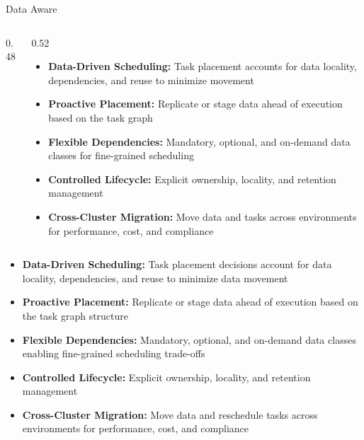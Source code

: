 \begin{frame}{Data Aware}
\begin{columns}[T]
\begin{column}{0.48\textwidth}
		\end{column}
		\begin{column}{0.52\textwidth}
			\vspace{0.4cm}
			\begin{itemize}
				\item \textbf{Data-Driven Scheduling:} Task placement accounts for data locality, dependencies, and reuse to minimize movement
				\item \textbf{Proactive Placement:} Replicate or stage data ahead of execution based on the task graph
				\item \textbf{Flexible Dependencies:} Mandatory, optional, and on-demand data classes for fine-grained scheduling
				\item \textbf{Controlled Lifecycle:} Explicit ownership, locality, and retention management
				\item \textbf{Cross-Cluster Migration:} Move data and tasks across environments for performance, cost, and compliance
			\end{itemize}
		\end{column}
	\end{columns}

	\note
	{
		\begin{itemize}
			\item \textbf{Data-Driven Scheduling:} Task placement decisions account for data locality, dependencies, and reuse to minimize data movement
			\item \textbf{Proactive Placement:} Replicate or stage data ahead of execution based on the task graph structure
			\item \textbf{Flexible Dependencies:} Mandatory, optional, and on-demand data classes enabling fine-grained scheduling trade-offs
			\item \textbf{Controlled Lifecycle:} Explicit ownership, locality, and retention management
			\item \textbf{Cross-Cluster Migration:} Move data and reschedule tasks across environments for performance, cost, and compliance
		\end{itemize}
	}

\end{frame}

